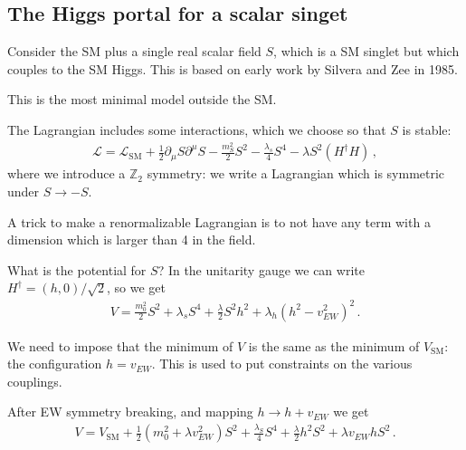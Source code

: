 \documentclass[main.tex]{subfiles}
\begin{document}
\subsection{The Higgs portal for a scalar singet}

Consider the SM plus a single real scalar field \(S\), 
which is a SM singlet but which couples to the SM Higgs. 
This is based on early work by Silvera and Zee in 1985. 

This is the most minimal model outside the SM.

The Lagrangian includes some interactions, which we choose so that \(S\) is stable: 
%
\begin{align}
\mathscr{L} = \mathscr{L} _{\text{SM}} + \frac{1}{2} \partial_\mu S \partial^\mu S 
- \frac{m_S^2}{2} S^2
- \frac{\lambda_s}{4} S^4
- \lambda S^2 (H ^\dag H)
\,,
\end{align}
%
where we introduce a \(\mathbb{Z}_2\) symmetry: 
we write a Lagrangian which is symmetric under \(S \to - S\). 

A trick to make a renormalizable Lagrangian is to not have any term with a 
dimension which is larger than 4 in the field. 

What is the potential for \(S\)? 
In the unitarity gauge we can write \(H ^\dag  = (h, 0 ) / \sqrt{2}\), 
so we get 
%
\begin{align}
V = \frac{m_0^2}{2} S^2 + \lambda _s S^4 + \frac{\lambda}{2} S^2 h^2
+ \lambda _h (h^2 - v_{EW}^2)^2
\,.
\end{align}

We need to impose that the minimum of \(V\) is the same as the minimum of \(V _{\text{SM}}\): 
the configuration \(h = v _{EW}\).
This is used to put constraints on the various couplings. 

After EW symmetry breaking, and mapping \(h \to h + v_{EW}\) we get 
%
\begin{align}
V = V _{\text{SM}} + \frac{1}{2} (m_{0}^2 + \lambda v_{EW}^2) S^2
+ \frac{\lambda_S}{4} S^4 
+ \frac{\lambda}{2} h^2 S^2
+ \lambda v_{EW} h S^2
\,.
\end{align}
\end{document}
